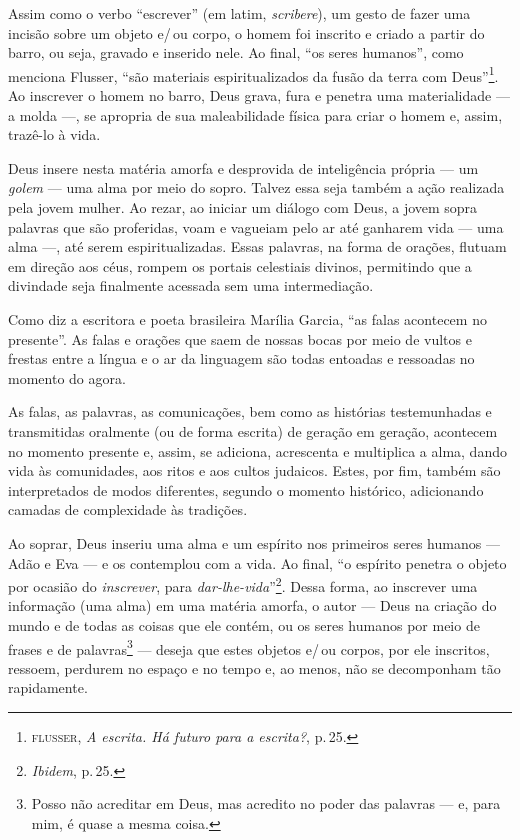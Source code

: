 Assim como o verbo ``escrever'' (em latim, \emph{scribere}), um gesto de
fazer uma incisão sobre um objeto e/\,ou corpo, o homem foi inscrito e
criado a partir do barro, ou seja, gravado e inserido nele. Ao final,
``os seres humanos'', como menciona Flusser, ``são
materiais espiritualizados da fusão da terra com Deus''\footnote{\textsc{flusser},
  \emph{A escrita. Há futuro para a escrita?}, p.\,25.}. Ao inscrever o
homem no barro, Deus grava, fura e penetra uma materialidade --- a molda
---, se apropria de sua maleabilidade física para criar o homem e,
assim, trazê-lo à vida.

Deus insere nesta matéria amorfa e desprovida de inteligência própria
--- um \emph{golem} --- uma alma por meio do sopro. Talvez essa seja
também a ação realizada pela jovem mulher. Ao rezar, ao iniciar um
diálogo com Deus, a jovem sopra palavras que são proferidas, voam e
vagueiam pelo ar até ganharem vida --- uma alma ---, até serem
espiritualizadas. Essas palavras, na forma de orações, flutuam em
direção aos céus, rompem os portais celestiais divinos, permitindo que a
divindade seja finalmente acessada sem uma intermediação.

Como diz a escritora e poeta brasileira Marília Garcia, ``as falas
acontecem no presente''. As falas e orações que saem de nossas bocas
por meio de vultos e frestas entre a língua e o ar da linguagem são
todas entoadas e ressoadas no momento do agora.

As falas, as palavras, as comunicações, bem como as histórias
testemunhadas e transmitidas oralmente (ou de forma escrita) de geração
em geração, acontecem no momento presente e, assim, se adiciona,
acrescenta e multiplica a alma, dando vida às comunidades, aos ritos e
aos cultos judaicos. Estes, por fim, também são interpretados de modos
diferentes, segundo o momento histórico, adicionando camadas de
complexidade às tradições.

Ao soprar, Deus inseriu uma alma e um espírito nos primeiros seres
humanos --- Adão e Eva --- e os contemplou com a vida. Ao final,
``o espírito penetra o objeto por ocasião do \emph{inscrever}, para \emph{dar-lhe-vida}''\footnote{\emph{Ibidem}, p.\,25.}. Dessa forma, ao inscrever
uma informação (uma alma) em uma matéria amorfa, o autor --- Deus na
criação do mundo e de todas as coisas que ele contém, ou os seres
humanos por meio de frases e de palavras\footnote{Posso não acreditar em
  Deus, mas acredito no poder das palavras --- e, para mim, é quase a
  mesma coisa.} --- deseja que estes objetos e/\,ou corpos, por ele
inscritos, ressoem, perdurem no espaço e no tempo e, ao menos, não se
decomponham tão rapidamente.


